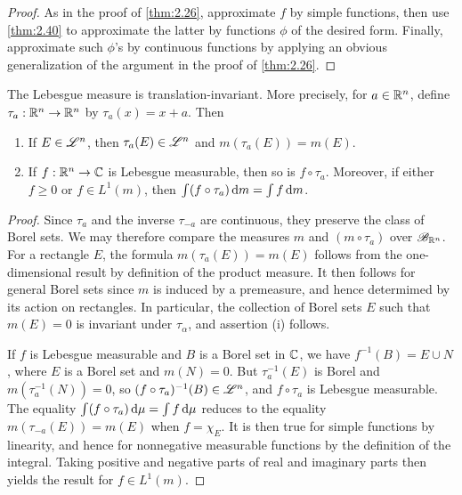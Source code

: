 \documentclass[12pt]{article} %
\begin{document}
\begin{proof}
    As in the proof of \cref{thm:2.26}, approximate $f$ by simple functions, then use \cref{thm:2.40} to approximate the latter by functions $\phi$ of the desired form. Finally, approximate such $\phi$'s by continuous functions by applying an obvious generalization of the argument in the proof of \cref{thm:2.26}.
\end{proof}

\begin{theorem}
    The Lebesgue measure is translation-invariant. More precisely, for $a \in \mathbb{R}^n$, define $\tau_a : \mathbb{R}^n \to \mathbb{R}^n$ by $\tau_a(x) = x + a$. Then \begin{enumerate}
        \item If $E \in \mathscr{L}^n$, then $\tau_a(E) \in \mathscr{L}^n$ and $m(\tau_a(E)) = m(E)$.
        \item If $f : \mathbb{R}^n \to \mathbb{C}$ is Lebesgue measurable, then so is $f \circ \tau_a$. Moreover, if either $f \geq 0$ or $f \in L^1(m)$, then $\int (f \circ \tau_a) \, \mathrm{d} m = \int f \, \mathrm{d} m$.
    \end{enumerate}
\end{theorem}

\begin{proof}
    Since $\tau_a$ and the inverse $\tau_{-a}$ are continuous, they preserve the class of Borel sets. We may therefore compare the measures $m$ and $(m \circ \tau_a)$ over $\mathscr{B}_{\mathbb{R}^n}$. For a rectangle $E$, the formula $m(\tau_a(E)) = m(E)$ follows from the one-dimensional result by definition of the product measure. It then follows for general Borel sets since $m$ is induced by a premeasure, and hence determimed by its action on rectangles. In particular, the collection of Borel sets $E$ such that $m(E) = 0$ is invariant under $\tau_\alpha$, and assertion (i) follows.

    If $f$ is Lebesgue measurable and $B$ is a Borel set in $\mathbb{C}$, we have $f^{-1}(B) = E \cup N$, where $E$ is a Borel set and $m(N) = 0$. But $\tau_a^{-1}(E)$ is Borel and $m(\tau_a^{-1}(N)) = 0$, so $(f \circ \tau_a)^{-1}(B) \in \mathscr{L}^n$, and $f \circ \tau_a$ is Lebesgue measurable. The equality $\int (f \circ \tau_a) \, \mathrm{d} \mu = \int f \, \mathrm{d} \mu$ reduces to the equality $m(\tau_{-a}(E)) = m(E)$ when $f = \chi_E$. It is then true for simple functions by linearity, and hence for nonnegative measurable functions by the definition of the integral. Taking positive and negative parts of real and imaginary parts then yields the result for $f \in L^1(m)$.
\end{proof}
\end{document}
